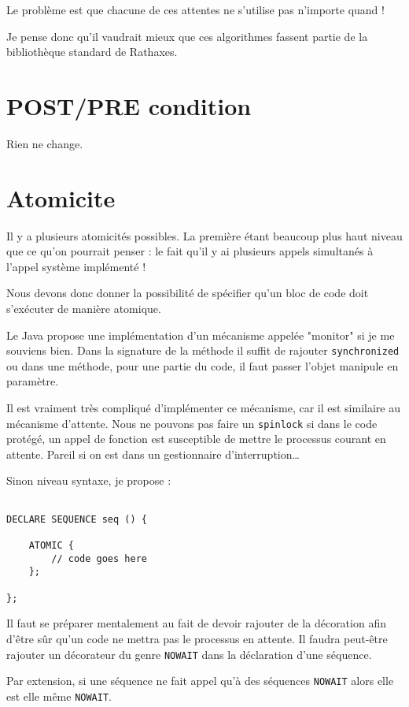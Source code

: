 \documentclass{rtxreport}
\begin{document}
Le problème est que chacune de ces attentes ne s’utilise pas n’importe quand !

Je pense donc qu’il vaudrait mieux que ces algorithmes fassent partie de la bibliothèque standard de Rathaxes.

\section{POST/PRE condition}

Rien ne change.

\section{Atomicite}
Il y a plusieurs atomicités possibles. La première étant beaucoup plus haut niveau que ce qu’on pourrait penser : le fait qu’il y ai plusieurs appels simultanés à l’appel système implémenté !

Nous devons donc donner la possibilité de spécifier qu’un bloc de code doit s’exécuter de manière atomique.

Le Java propose une implémentation d’un mécanisme appelée "monitor" si je me souviens bien. Dans la signature de la méthode il suffit de rajouter \texttt{synchronized} ou dans une méthode, pour une partie du code, il faut passer l’objet manipule en paramètre.

Il est vraiment très compliqué d’implémenter ce mécanisme, car il est similaire au mécanisme d’attente. Nous ne pouvons pas faire un \texttt{spinlock} si dans le code protégé, un appel de fonction est susceptible de mettre le processus courant en attente. Pareil si on est dans un gestionnaire d’interruption\ldots

Sinon niveau syntaxe, je propose :
\begin{lstlisting}

DECLARE SEQUENCE seq () {

	ATOMIC {
		// code goes here
	};

};

\end{lstlisting}

Il faut se préparer mentalement au fait de devoir rajouter de la décoration afin d’être sûr qu’un code ne mettra pas le processus en attente. Il faudra peut-être rajouter un décorateur du genre \texttt{NOWAIT} dans la déclaration d’une séquence.

Par extension, si une séquence ne fait appel qu’à des séquences \texttt{NOWAIT} alors elle est elle même \texttt{NOWAIT}.
\end{document}
